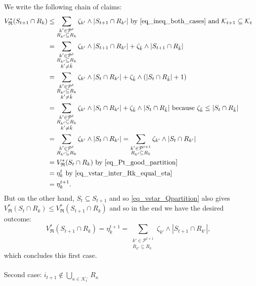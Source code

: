 \documentclass[
  11pt,
  a4paper,
]{article}
\makeatletter
\let\oldparagraph\paragraph
\renewcommand{\paragraph}{
    \@ifstar
      \xxxParagraphStar
      \xxxParagraphNoStar
  }
\newcommand{\xxxParagraphStar}[1]{\oldparagraph*{#1}\mbox{}}
\newcommand{\xxxParagraphNoStar}[1]{\oldparagraph{#1}\mbox{}}
\theoremstyle{plain}
\theoremstyle{plain}
\theoremstyle{definition}
\theoremstyle{plain}
\theoremstyle{definition}
\theoremstyle{remark}
\makeatother
\begin{document}
We write the following chain of claims: \begin{align*}
V^*_{\mathfrak{R}}(S_{t+1}\cap R_k)&\leq \sum_{\substack{k'\in\mathcal{P}^{t}\\R_{k'}\subseteq R_k}} \zeta_{k'}\wedge |S_{t+1}\cap R_{k'}|\text{ by~\eqref{eq_ineq_both_cases} and }\mathcal{K}_{t+1}\subseteq\mathcal{K}_t\\
&=\sum_{\substack{k'\in\mathcal{P}^{t}\\R_{k'}\subseteq R_k\\ k'\neq\bar k}} \zeta_{k'}\wedge |S_{t+1}\cap R_{k'}| + \zeta_{\bar k}\wedge |S_{t+1}\cap R_{\bar k}| \\
&=\sum_{\substack{k'\in\mathcal{P}^{t}\\R_{k'}\subseteq R_k\\ k'\neq\bar k}} \zeta_{k'}\wedge |S_{t}\cap R_{k'}| + \zeta_{\bar k}\wedge( |S_{t}\cap R_{\bar k}| +1)\\
&=\sum_{\substack{k'\in\mathcal{P}^{t}\\R_{k'}\subseteq R_k\\ k'\neq\bar k}} \zeta_{k'}\wedge |S_{t}\cap R_{k'}| + \zeta_{\bar k}\wedge|S_{t}\cap R_{\bar k}|\text{ because $\zeta_{\bar k}\leq |S_t\cap R_{\bar k}|$}\\
&=\sum_{\substack{k'\in\mathcal{P}^{t}\\R_{k'}\subseteq R_k}} \zeta_{k'}\wedge |S_{t}\cap R_{k'}|=\sum_{\substack{k'\in\mathcal{P}^{t+1}\\R_{k'}\subseteq R_k}} \zeta_{k'}\wedge |S_{t}\cap R_{k'}| \\
&=V^*_{\mathfrak{R}}(S_t\cap R_k)  \text{ by~\eqref{eq_Pt_good_partition}} \\
&= \eta_k^t  \text{ by~\eqref{eq_vstar_inter_Rk_equal_eta}} \\
&= \eta_k^{t+1}.\\
\end{align*} But on the other hand, \(S_t\subseteq S_{t+1}\) and so
\eqref{eq_vstar_Qpartition} also gives
\(V^*_{\mathfrak{R}}(S_t\cap R_k) \leq V^*_{\mathfrak{R}}(S_{t+1}\cap R_k)\)
and so in the end we have the desired outcome: \begin{equation*}
V^*_{\mathfrak{R}}(S_{t+1}\cap R_k) =  \eta_k^{t+1} =  \sum_{\substack{k'\in\mathcal{P}^{t+1}\\R_{k'}\subseteq R_k}} \zeta_{k'}\wedge |S_{t+1}\cap R_{k'}| ,
\end{equation*} which concludes this first case.

\paragraph{\texorpdfstring{Second case:
\(i_{t+1}\not\in\bigcup_{\kappa\in\mathcal{K}^-_{t}}R_{\kappa}\)}{Second case: i\_\{t+1\}\textbackslash not\textbackslash in\textbackslash bigcup\_\{\textbackslash kappa\textbackslash in\textbackslash mathcal\{K\}\^{}-\_\{t\}\}R\_\{\textbackslash kappa\}}}\label{second-case-i_t1notinbigcup_kappainmathcalk-_tr_kappa}
\end{document}
